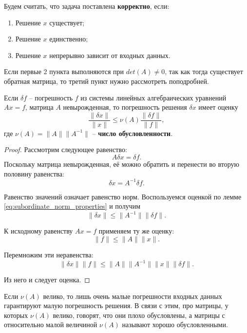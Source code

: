 \documentclass{article}
\begin{document}
\begin{define}
	Будем считать, что задача поставлена \textbf{корректно}, если:
	\begin{enumerate}[nosep]
		\item Решение $x$ существует;
		\item Решение $x$ единственно;
		\item Решение $x$ непрерывно зависит от входных данных.
	\end{enumerate}
\end{define}

Если первые 2 пункта выполняются при $det(A)\ne 0$, так как тогда существует
обратная матрица, то третий пункт нужно рассмотреть поподробней.

\begin{theorem}
	Если $\delta f$ -- погрешность $f$ из системы линейных алгебраических
	уравнений $Ax=f$, матрица $A$ невырожденная, то погрешность решения
	$\delta x$ имеет оценку
	\[\boxed{\frac{\|\delta x\|}{\|x\|}\le\nu(A)\frac{\|\delta f\|}
	{\|f\|}},\]
	где $\nu(A)=\|A\|\|A^{-1}\|$ -- \textbf{число обусловленности}.
\end{theorem}

\begin{proof}
	Рассмотрим следующее равенство:
	\[A\delta x=\delta f.\]
	Поскольку матрица невырожденная, её можно обратить и перенести во вторую
	половину равенства:
	\[\delta x=A^{-1}\delta f.\]

	Равенство значений означает равенство норм. Воспользуемся оценкой по
	лемме \eqref{eq:subordinate_norm_properties} и получим
	\[\|\delta x\|\le\|A^{-1}\|\|\delta f\|.\]

	К исходному равенству $Ax=f$ применяем ту же оценку:
	\[\|f\|\le\|A\|\|x\|.\]

	Перемножим эти неравенства:
	\[\|\delta x\|\|f\|\le\|A\|\|A^{-1}\|\|x\|\|\delta f\|.\]

	Из него и следует оценка.
\end{proof}

Если $\nu(A)$ велико, то лишь очень малые погрешности входных данных гарантируют
малую погрешность решения. В связи с этим, про матрицы, у которых $\nu(A)$
велико, говорят, что они плохо обусловлены, а матрицы с относительно малой
величиной $\nu(A)$ называют хорошо обусловленными.
\end{document}
